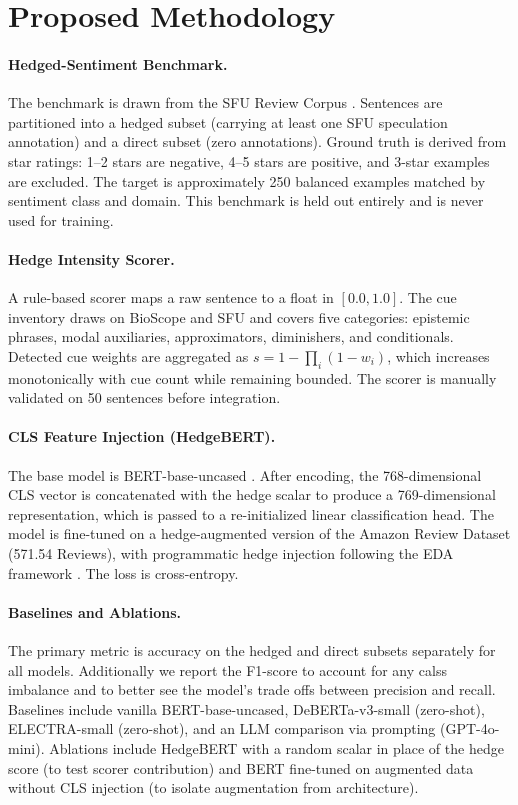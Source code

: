 \documentclass[11pt]{article}
\begin{document}
\section{Proposed Methodology}

\paragraph{Hedged-Sentiment Benchmark.} The benchmark is drawn from the SFU Review
Corpus \cite{konstantinova2012sfu}. Sentences are partitioned into a hedged subset
(carrying at least one SFU speculation annotation) and a direct subset (zero
annotations). Ground truth is derived from star ratings: 1--2 stars are negative,
4--5 stars are positive, and 3-star examples are excluded. The target is
approximately 250 balanced examples matched by sentiment class and domain. This
benchmark is held out entirely and is never used for training.

\paragraph{Hedge Intensity Scorer.} A rule-based scorer maps a raw sentence to a
float in $[0.0, 1.0]$. The cue inventory draws on BioScope \cite{vincze2008bioscope}
and SFU \cite{konstantinova2012sfu} and covers five categories: epistemic phrases,
modal auxiliaries, approximators, diminishers, and conditionals. Detected cue weights
are aggregated as $s = 1 - \prod_i (1 - w_i)$, which increases monotonically with
cue count while remaining bounded. The scorer is manually validated on 50 sentences
before integration.

\paragraph{CLS Feature Injection (HedgeBERT).} The base model is BERT-base-uncased
\cite{devlin2019bert}. After encoding, the 768-dimensional CLS vector is concatenated
with the hedge scalar to produce a 769-dimensional representation, which is passed to
a re-initialized linear classification head. The model is fine-tuned on a
hedge-augmented version of the Amazon Review Dataset (571.54 Reviews), with
programmatic hedge injection following the EDA framework \cite{wei2019eda}. The loss
is cross-entropy.

\paragraph{Baselines and Ablations.} The primary metric is accuracy on the hedged
and direct subsets separately for all models. Additionally we report the F1-score
to account for any calss imbalance and to better see the model's trade offs between
precision and recall. Baselines include vanilla BERT-base-uncased, DeBERTa-v3-small
(zero-shot), ELECTRA-small (zero-shot), and an LLM comparison via prompting (GPT-4o-mini). 
Ablations include HedgeBERT with a random scalar in place of the hedge score  
(to test scorer contribution) and BERT fine-tuned on augmented data without 
CLS injection (to isolate augmentation from architecture).
\end{document}
